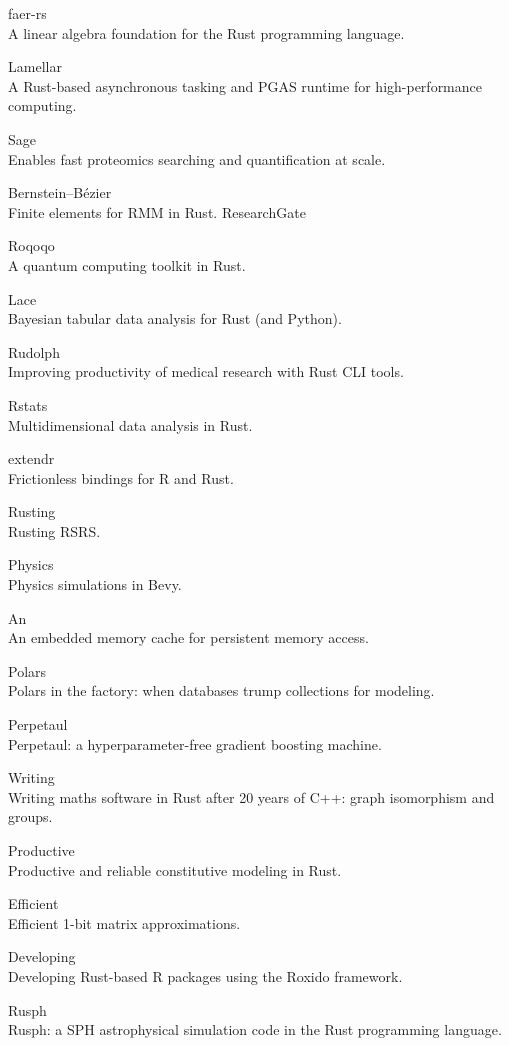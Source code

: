 \documentclass{article}
\begin{document}
faer-rs\\
A linear algebra foundation for the Rust programming language.

Lamellar\\
A Rust-based asynchronous tasking and PGAS runtime for high-performance computing.

Sage\\
Enables fast proteomics searching and quantification at scale.

Bernstein–Bézier\\
Finite elements for RMM in Rust. ResearchGate

Roqoqo\\
A quantum computing toolkit in Rust.

Lace\\
Bayesian tabular data analysis for Rust (and Python).

Rudolph\\
Improving productivity of medical research with Rust CLI tools.

Rstats\\
Multidimensional data analysis in Rust.

extendr\\
Frictionless bindings for R and Rust.

Rusting\\
Rusting RSRS.

Physics\\
Physics simulations in Bevy.

An\\
An embedded memory cache for persistent memory access.

Polars\\
Polars in the factory: when databases trump collections for modeling.

Perpetaul\\
Perpetaul: a hyperparameter-free gradient boosting machine.

Writing\\
Writing maths software in Rust after 20 years of C++: graph isomorphism and groups.

Productive\\
Productive and reliable constitutive modeling in Rust.

Efficient\\
Efficient 1-bit matrix approximations.

Developing\\
Developing Rust-based R packages using the Roxido framework.

Rusph\\
Rusph: a SPH astrophysical simulation code in the Rust programming language.
\end{document}
